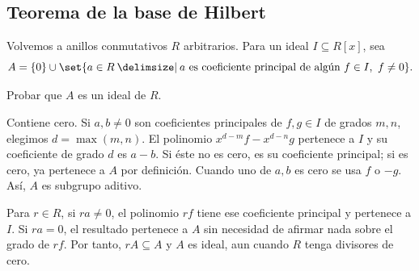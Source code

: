 \subsection{Teorema de la base de Hilbert}\label{tema:15-2-2}\label{tema:15-2-3}
Volvemos a anillos conmutativos $R$ arbitrarios. Para un ideal $I\subseteq R[x]$, sea
\[
A=\{0\}\cup\set{a\in R\given
a\text{ es coeficiente principal de algún }f\in I,\ f\ne0}.
\]
\begin{ejer}\label{ejer:C15-principales}
Probar que $A$ es un ideal de $R$.
\end{ejer}
\begin{sol}
Contiene cero. Si $a,b\ne0$ son coeficientes principales de $f,g\in I$ de grados $m,n$, elegimos $d=\max(m,n)$. El polinomio $x^{d-m}f-x^{d-n}g$ pertenece a $I$ y su coeficiente de grado $d$ es $a-b$. Si éste no es cero, es su coeficiente principal; si es cero, ya pertenece a $A$ por definición. Cuando uno de $a,b$ es cero se usa $f$ o $-g$. Así, $A$ es subgrupo aditivo.

Para $r\in R$, si $ra\ne0$, el polinomio $rf$ tiene ese coeficiente principal y pertenece a $I$. Si $ra=0$, el resultado pertenece a $A$ sin necesidad de afirmar nada sobre el grado de $rf$. Por tanto, $rA\subseteq A$ y $A$ es ideal, aun cuando $R$ tenga divisores de cero.
\end{sol}

